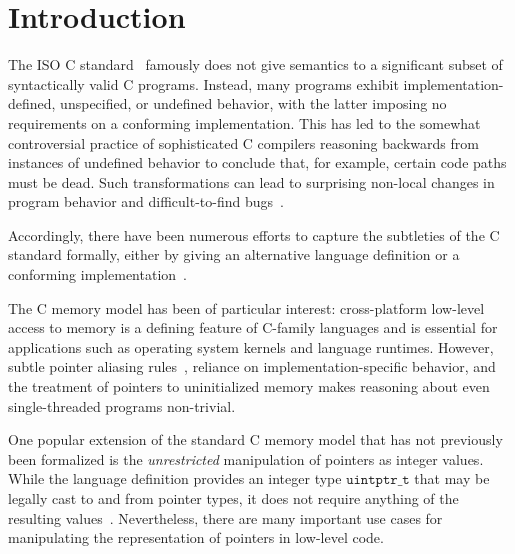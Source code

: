 \section{Introduction}
%

The ISO C standard~\cite{iso2011iec} famously does not give semantics to a significant
subset of syntactically valid C programs. Instead, many programs
exhibit implementation-defined, unspecified, or undefined behavior,
with the latter imposing no requirements on a conforming
implementation. This has led to the somewhat controversial practice of
sophisticated C compilers reasoning backwards from instances of
undefined behavior to conclude that, for example, certain code paths
must be dead. Such transformations can lead to surprising non-local
changes in program behavior and difficult-to-find bugs~\cite{wang2013towards,yang2011finding}.

Accordingly, there have been numerous efforts to capture the
subtleties of the C standard formally, either by giving an alternative
language definition or a conforming implementation~\cite{norrish1998c,leroy:compcert,ellison2012executable}.

 The C memory model has been of
particular interest: cross-platform low-level access to memory is a
defining feature of C-family languages and is essential for
applications such as operating system kernels and language
runtimes. However, subtle pointer aliasing
rules~\cite{krebbers2013aliasing}, reliance on implementation-specific
behavior, and the treatment of pointers to uninitialized memory makes
reasoning about even single-threaded programs non-trivial.

One popular extension of the standard C memory model that has not
previously been formalized is the \emph{unrestricted} manipulation of
pointers as integer values. While the language definition provides an integer
type $\mathtt{uintptr\_t}$ that may be legally cast to and from pointer
types, it does not require anything of the resulting values~\cite[\S7.20.1.4p1]{iso2011iec}. 
Nevertheless, there are many important use cases for manipulating
the representation of pointers in low-level code.

